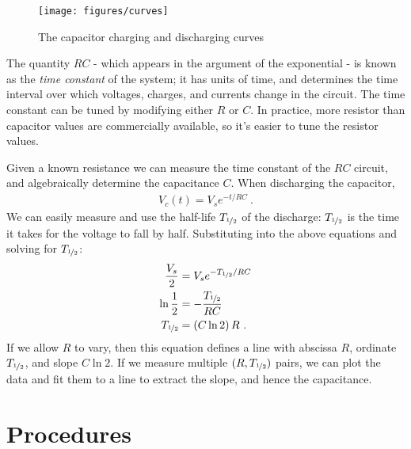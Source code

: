 \documentclass[12pt]{article}
\newcommand{\halflife}{\ensuremath{T_{\nicefrac{1}{2}}}\xspace}
\begin{document}
\begin{figure}
  \centering
  \texttt{[image: figures/curves]}
  \caption{The capacitor charging and discharging curves}
  \label{fig:curves}
\end{figure}
The quantity $RC$ - which appears in the argument of the exponential -
is known as the \textit{time constant} of the system; it has units of
time, and determines the time interval over which voltages, charges,
and currents change in the circuit.  The time constant can be tuned by
modifying either $R$ or $C$.  In practice, more resistor than
capacitor values are commercially available, so it's easier to tune
the resistor values.

Given a known resistance we can measure the time constant of the $RC$
circuit, and algebraically determine the capacitance $C$.  When
discharging the capacitor,
\begin{gather*}
  V_c(t) = V_s e^{-t/RC}\ .
\end{gather*}
We can easily measure and use the half-life \halflife of the
discharge: \halflife is the time it takes for the voltage
to fall by half.  Substituting into the above equations and solving
for \halflife:
\begin{align*}
  \frac{V_s}{2} &= V_s e^{-\halflife/RC}\\
  \ln \frac{1}{2} &= -\frac{\halflife}{RC}\\
  \halflife &= \left(C \ln 2\right) R\ .
\end{align*}
If we allow $R$ to vary, then this equation defines a line with
abscissa $R$, ordinate \halflife, and slope $C \ln 2$.  If we measure
multiple $(R, \halflife)$ pairs, we can plot the data and fit them to
a line to extract the slope, and hence the capacitance.

\section{Procedures}
\label{sec:procedures}
\end{document}
